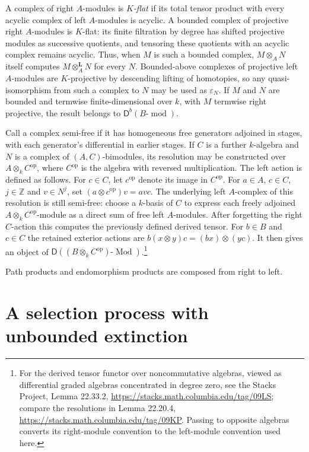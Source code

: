 \documentclass[11pt]{article}
\numberwithin{equation}{section}
\theoremstyle{definition}
\theoremstyle{remark}
\newcommand{\Z}{\mathbb Z}
\newcommand{\D}{\mathsf D}
\newcommand{\otL}{\otimes^{\mathbf L}}
\DeclareMathOperator{\Mod}{Mod}
\DeclareMathOperator{\modu}{mod}
\begin{document}
A complex of right $A$-modules is \emph{$K$-flat} if its total
tensor product with every acyclic complex of left $A$-modules is
acyclic.  A bounded complex of projective right $A$-modules is
$K$-flat: its finite filtration by degree has shifted projective
modules as successive quotients, and tensoring these quotients
with an acyclic complex remains acyclic.  Thus, when $M$ is such
a bounded complex, $M\otimes_A N$ itself computes $M\otL_A N$
for every $N$.  Bounded-above complexes of projective left
$A$-modules are $K$-projective by descending lifting of homotopies,
so any quasi-isomorphism from such a complex to $N$ may be used
as $\varepsilon_N$.  If $M$ and $N$ are bounded and termwise
finite-dimensional over $k$, with $M$ termwise right projective,
the result belongs to $\D^b(B\text{-}\modu)$.

Call a complex semi-free if it has homogeneous free generators
adjoined in stages, with each generator's differential in earlier
stages.  If $C$ is a further $k$-algebra and $N$ is a complex of
$(A,C)$-bimodules, its resolution may be constructed over
$A\otimes_k C^{\mathrm{op}}$, where $C^{\mathrm{op}}$ is the
algebra with reversed multiplication.  The left action is defined as follows.  For $c\in C$, let $c^{\mathrm{op}}$
denote its image in $C^{\mathrm{op}}$.  For $a\in A$, $c\in C$,
$j\in\Z$ and $v\in N^j$, set $(a\otimes c^{\mathrm{op}})v=avc$.
The underlying left $A$-complex of this resolution is still semi-free: choose a $k$-basis of $C$ to
express each freely adjoined $A\otimes_k C^{\mathrm{op}}$-module
as a direct sum of free left $A$-modules.
After forgetting the right $C$-action this computes the previously
defined derived tensor.  For $b\in B$ and $c\in C$ the retained
exterior actions are $b(x\otimes y)c=(bx)\otimes(yc)$.
It then gives an object of
$\D((B\otimes_k C^{\mathrm{op}})\text{-}\Mod)$.\footnote{For the derived tensor functor
over noncommutative algebras, viewed as differential graded
algebras concentrated in degree zero, see the Stacks Project,
Lemma 22.33.2, \url{https://stacks.math.columbia.edu/tag/09LS};
compare the resolutions in Lemma 22.20.4,
\url{https://stacks.math.columbia.edu/tag/09KP}.  Passing to
opposite algebras converts its right-module convention to the
left-module convention used here.}

Path products and endomorphism products are composed from right to left.

\section{A selection process with unbounded extinction}
\label{sec:selection}
\end{document}
